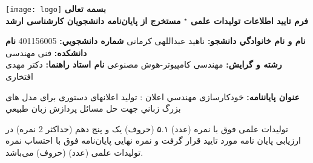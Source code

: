 \renewcommand{\thefootnote}{\fnsymbol{footnote}}
\thispagestyle{empty}
\begin{landscape}
\begin{center}
\texttt{[image: logo]}
\vskip -3mm
{\bfseries \fontsize{11}{12}\selectfont
	بسمه تعالی} \\
\vskip -2mm
{\bfseries \fontsize{11}{12}\selectfont
فرم تایید اطلاعات تولیدات علمی
$^\star$
مستخرج از پایان‌نامه دانشجويان کارشناسی ارشد
}\\
\end{center}
\begin{center}
\fontsize{12}{13}\selectfont

 \textbf{نام و نام خانوادگي دانشجو: }
ناهید عبداللهی کرمانی
\textbf{شماره دانشجويي:}
401156005
\textbf{نام دانشکده:}
فنی مهندسی\\
\textbf{رشته و گرايش:}
مهندسی کامپیوتر-هوش مصنوعی
\textbf{نام استاد راهنما:}
دکتر مهدی افتخاری\\
\end{center}
\begin{center}
	{\small{}}
	\textbf{عنوان پایان\/نامه:}
	خودکارسازی مهندسي اعلان : تولید اعلان\/های دستوری برای مدل های بزرگ زباني جهت حل مسائل پردازش زبان طبیعي 

	\end{center}
\fontsize{9}{10}\selectfont
\begin{center}
تولیدات علمی فوق با نمره (عدد) ۵.۱ (حروف) یک و پنج دهم (حداکثر 2 نمره) در ارزیابی پایان نامه مورد تایید قرار گرفت و نمره نهایی پایان‌نامه فوق با احتساب نمره تولیدات علمی   (عدد)            (حروف)  می‌باشد.


\end{center}
\end{landscape}
